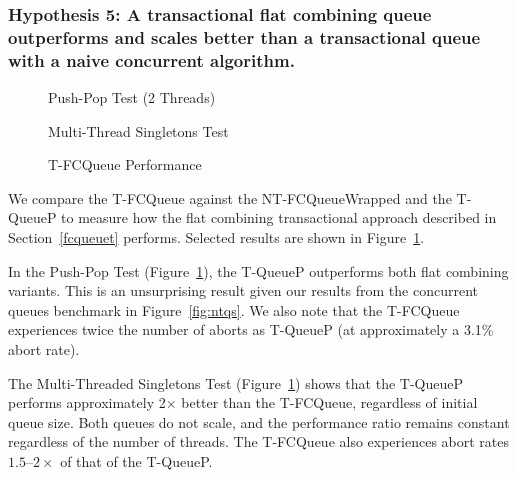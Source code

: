 \subsubsection{Hypothesis 5: A transactional flat combining queue outperforms and scales better than a transactional queue with a naive concurrent algorithm.}
\label{eval:hypo5}

\begin{figure}[H]
    \centering
	\begin{minipage}{0.75\textwidth}
        \caption*{Push-Pop Test (2 Threads)}
        \vspace{12pt}
	\end{minipage}
   	\begin{minipage}{0.75\textwidth}
        \caption*{Multi-Thread Singletons Test}
	\end{minipage}
        \caption{T-FCQueue Performance}
    \label{fig:tqs}
\end{figure}

We compare the T-FCQueue against the NT-FCQueueWrapped and the T-QueueP to measure how the flat combining transactional approach described in Section~\ref{fcqueuet} performs. Selected results are shown in Figure~\ref{fig:tqs}.

In the Push-Pop Test (Figure~\ref{fig:tqs}), the T-QueueP outperforms both flat combining variants. This is an unsurprising result given our results from the concurrent queues benchmark in Figure~\ref{fig:ntqs}. We also note that the T-FCQueue experiences twice the number of aborts as T-QueueP (at approximately a 3.1\% abort rate).

The Multi-Threaded Singletons Test (Figure~\ref{fig:tqs}) shows that the T-QueueP performs approximately 2$\times$ better than the T-FCQueue, regardless of initial queue size. Both queues do not scale, and the performance ratio remains constant regardless of the number of threads. The T-FCQueue also experiences abort rates $1.5$--$2\times$ of that of the T-QueueP.

\vspace{12pt}
\noindent{}

